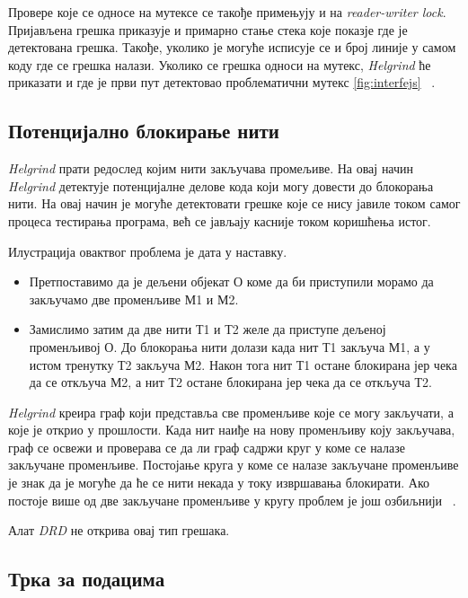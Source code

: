 \documentclass[12pt,oneside]{memoir}
\begin{document}
\indent Провере које се односе на мутексе се такође примењују и на \textit{reader-writer lock}. Пријављена грешка приказује и примарно стање стека које показје где је детектована грешка. Такође, уколико је могуће исписује се и број линије у самом коду где се грешка налази. Уколико се грешка односи на мутекс, \textit{Helgrind} ће приказати и где је први пут детектовао проблематични мутекс \ref{fig:interfejs} ~\cite{helgrindRef}. 

\subsection{Потенцијално блокирање нити}

\indent \textit{Helgrind} прати редослед којим нити закључава промељиве. На овај начин \textit{Helgrind} детектује потенцијалне делове кода који могу довести до блокорања нити. На овај начин је могуће детектовати грешке које се нису јавиле током самог процеса тестирања програма, већ се јављају касније током коришћења истог.

\indent Илустрација овактвог проблема је дата у наставку.

\begin{itemize}
  \item Претпоставимо да је дељени објекат О коме да би приступили морамо да закључамо две променљиве М1 и М2.
  \item  Замислимо затим да две нити Т1 и Т2 желе да приступе дељеној променљивој О. До блокорања нити долази када нит Т1 закључа М1, а у истом тренутку Т2 закључа М2. Након тога нит Т1 остане блокирана јер чека да се откључа М2, а нит Т2 остане блокирана јер чека да се откључа Т2.
\end{itemize}


\indent \textit{Helgrind} креира граф који представља све променљиве које се могу закључати, а које је открио у прошлости. Када нит наиђе на нову променљиву коју закључава, граф се освежи и проверава се да ли граф садржи круг у коме се налазе закључане променљиве. Постојање круга у коме се налазе закључане променљиве је знак да је могуће да ће се нити некада у току извршавања блокирати. Ако постоје више од две закључане променљиве у кругу проблем је још озбиљнији ~\cite{helgrindRef}.

\indent Алат \textit{DRD} не открива овај тип грешака.


\subsection{Трка за подацима}
\end{document}
